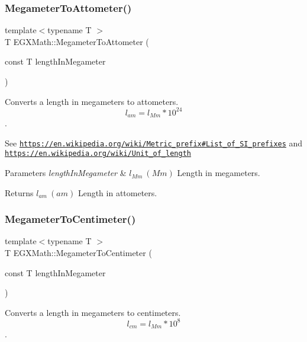 \subsubsection{\texorpdfstring{Megameter\+To\+Attometer()}{MegameterToAttometer()}}
{\footnotesize\ttfamily template$<$typename T $>$ \\
T E\+G\+X\+Math\+::\+Megameter\+To\+Attometer (\begin{DoxyParamCaption}\item[{const T}]{length\+In\+Megameter }\end{DoxyParamCaption})}



Converts a length in megameters to attometers. \[ l_{am}=l_{Mm} * 10^{24} \]. 

See \href{https://en.wikipedia.org/wiki/Metric_prefix#List_of_SI_prefixes}{\tt https\+://en.\+wikipedia.\+org/wiki/\+Metric\+\_\+prefix\#\+List\+\_\+of\+\_\+\+S\+I\+\_\+prefixes} and \href{https://en.wikipedia.org/wiki/Unit_of_length}{\tt https\+://en.\+wikipedia.\+org/wiki/\+Unit\+\_\+of\+\_\+length} 
\begin{DoxyParams}{Parameters}
{\em length\+In\+Megameter} & $ l_{Mm}\ (Mm)$ Length in megameters. \\
\hline
\end{DoxyParams}
\begin{DoxyReturn}{Returns}
$ l_{am}\ (am)$ Length in attometers. 
\end{DoxyReturn}
\mbox{\label{group___e_g_x_math-_conversions-_length_conversions-_s_i-_megameter-_s_i_gacbe2b41169d39f02fb70baedf0f8a9c4}} 
\subsubsection{\texorpdfstring{Megameter\+To\+Centimeter()}{MegameterToCentimeter()}}
{\footnotesize\ttfamily template$<$typename T $>$ \\
T E\+G\+X\+Math\+::\+Megameter\+To\+Centimeter (\begin{DoxyParamCaption}\item[{const T}]{length\+In\+Megameter }\end{DoxyParamCaption})}



Converts a length in megameters to centimeters. \[ l_{cm}=l_{Mm} * 10^{8} \]. 

